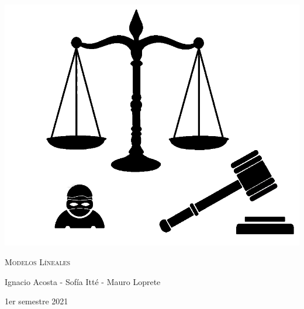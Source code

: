 \documentclass[11pt,a4paper]{article}\usepackage[]{graphicx}\usepackage[]{color}
\begin{document}
\begin{titlepage}
  \centering
    {\scshape\Huge{} \par}
  \vspace{3cm}
  \includegraphics[width=14cm]{CaratulaIgnatenko.png}
  \vfill
  \vfill
  {\scshape\LARGE Modelos Líneales \par}
  \vspace{3cm}
  {\Large Ignacio Acosta - Sofía Itté - Mauro Loprete \par}
  {\Large 1er semestre 2021 \par}
\end{titlepage}
\tableofcontents
{}
\listoffigures
\newpage
\end{document}

